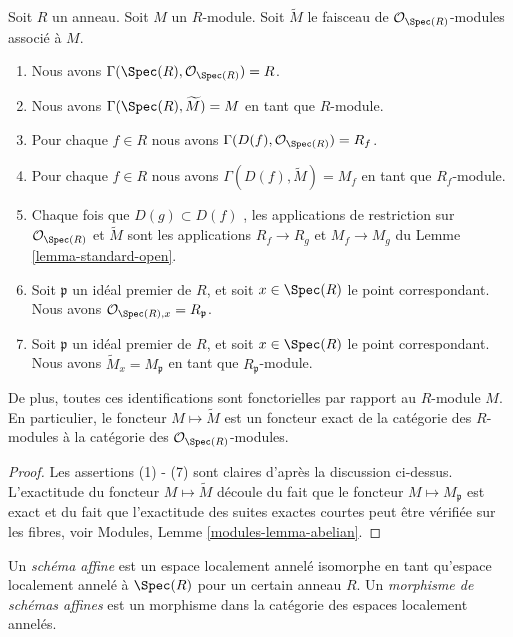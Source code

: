 \begin{lemma}
\label{lemma-spec-sheaves}
Soit  $R$  un anneau. Soit  $M$  un  $R$-module. Soit
 $\widetilde M$  le faisceau de  $\mathcal{O}_{\Spec(R)}$-modules associé à  $M$.
\begin{enumerate}
\item Nous avons  $\Gamma(\Spec(R), \mathcal{O}_{\Spec(R)}) = R$.
\item Nous avons  $\Gamma(\Spec(R), \widetilde M) = M$  en tant que  $R$-module.
\item Pour chaque  $f \in R$  nous avons  $\Gamma(D(f), \mathcal{O}_{\Spec(R)}) = R_f$.
\item Pour chaque  $f\in R$  nous avons  $\Gamma(D(f), \widetilde M) = M_f$  en tant que  $R_f$-module.
\item Chaque fois que  $D(g) \subset D(f)$ , les applications de restriction sur  $\mathcal{O}_{\Spec(R)}$  et
 $\widetilde M$  sont les applications  $R_f \to R_g$  et  $M_f \to M_g$  du Lemme  \ref{lemma-standard-open}.
\item Soit  $\mathfrak p$  un idéal premier de  $R$, et soit  $x \in \Spec(R)$  le point
correspondant. Nous avons  $\mathcal{O}_{\Spec(R), x} = R_{\mathfrak p}$.
\item Soit  $\mathfrak p$  un idéal premier de  $R$, et soit  $x \in \Spec(R)$  le point
correspondant. Nous avons  $\widetilde M_x = M_{\mathfrak p}$  en tant que  $R_{\mathfrak p}$-module.
\end{enumerate}
De plus, toutes ces identifications sont fonctorielles par rapport au  $R$-module
 $M$. En particulier, le foncteur  $M \mapsto \widetilde M$  est un foncteur exact de la
catégorie des  $R$-modules à la catégorie des  $\mathcal{O}_{\Spec(R)}$-modules.
\end{lemma}

\begin{proof}
Les assertions (1) - (7) sont claires d'après la discussion ci-dessus.
L'exactitude du foncteur  $M \mapsto \widetilde M$  découle du fait que le foncteur  $M \mapsto M_{\mathfrak p}$ 
est exact et du fait que l'exactitude des suites exactes courtes peut être
vérifiée sur les fibres, voir Modules, Lemme  \ref{modules-lemma-abelian}.
\end{proof}

\begin{definition}
\label{definition-affine-scheme}
Un  {\it  schéma affine}  est un espace localement
annelé isomorphe en tant qu'espace localement annelé à  $\Spec(R)$  pour un
certain anneau  $R$. Un  {\it  morphisme de schémas
affines}  est un morphisme dans la catégorie des espaces localement
annelés.
\end{definition}


